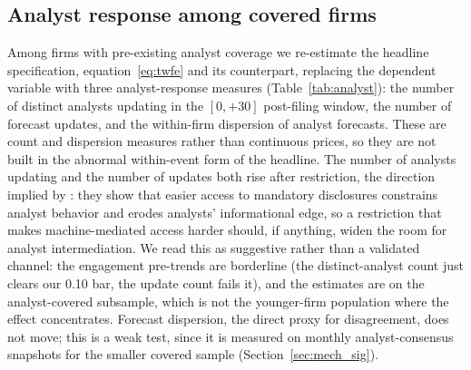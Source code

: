 \documentclass[12pt]{article}
\begin{document}
\subsection{Analyst response among covered firms}\label{app:analyst}
Among firms with pre-existing analyst coverage we re-estimate the headline specification, equation~\eqref{eq:twfe} and its \citet{BorusyakJaravelSpiess2024} counterpart, replacing the dependent variable with three analyst-response measures (Table~\ref{tab:analyst}): the number of distinct analysts updating in the $[0,+30]$ post-filing window, the number of forecast updates, and the within-firm dispersion of analyst forecasts. These are count and dispersion measures rather than continuous prices, so they are not built in the abnormal within-event form of the headline. The number of analysts updating and the number of updates both rise after restriction, the direction implied by \citet{ChangLjungqvistTseng2023}: they show that easier access to mandatory disclosures constrains analyst behavior and erodes analysts' informational edge, so a restriction that makes machine-mediated access harder should, if anything, widen the room for analyst intermediation. We read this as suggestive rather than a validated channel: the engagement pre-trends are borderline (the distinct-analyst count just clears our 0.10 bar, the update count fails it), and the estimates are on the analyst-covered subsample, which is not the younger-firm population where the effect concentrates. Forecast dispersion, the direct proxy for disagreement, does not move; this is a weak test, since it is measured on monthly analyst-consensus snapshots for the smaller covered sample (Section~\ref{sec:mech_sig}).





\end{document}
